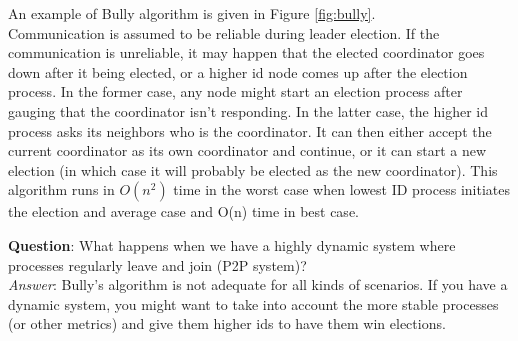 \documentclass[twoside]{article}
\begin{document}
An example of Bully algorithm is given in Figure \ref{fig:bully}.\\
Communication is assumed to be reliable during leader election. If the communication is unreliable, it may happen that the elected coordinator goes down after it being elected, or a higher id node comes up after the election process. In the former case, any node might start an election process after gauging that the coordinator isn't responding. In the latter case, the higher id process asks its neighbors who is the coordinator. It can then either accept the current coordinator as its own coordinator and continue, or it can start a new election (in which case it will probably be elected as the new coordinator). This algorithm runs in $O(n^2)$ time in the worst case when lowest ID process initiates the election and average case and O(n) time in best case.

\textbf{Question}: What happens when we have a highly dynamic system where processes regularly leave and join (P2P system)?\\
\emph{Answer}: Bully's algorithm is not adequate for all kinds of scenarios. If you have a dynamic system, you might want to take into account the more stable processes (or other metrics) and give them higher ids to have them win elections.
\end{document}
